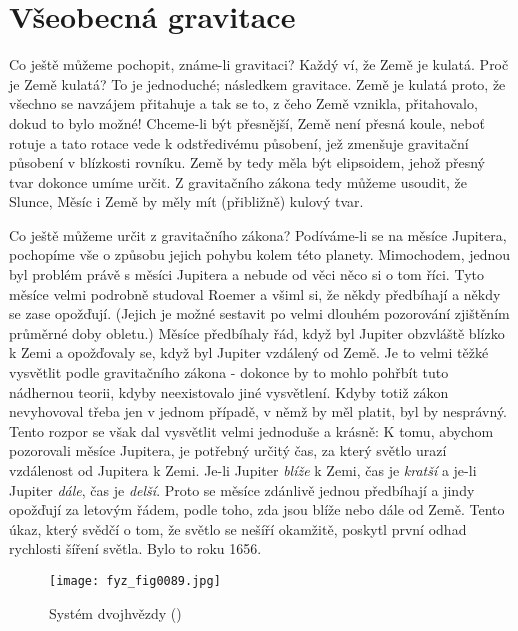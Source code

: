   \section{Všeobecná gravitace}
    Co ještě můžeme pochopit, známe-li gravitaci? Každý ví, že Země je kulatá. Proč je Země kulatá? 
    To je jednoduché; následkem gravitace. Země je kulatá proto, že všechno se navzájem přitahuje a 
    tak se to, z čeho Země vznikla, přitahovalo, dokud to bylo možné! Chceme-li být přesnější, Země 
    není přesná koule, neboť rotuje a tato rotace vede k odstředivému působení, jež zmenšuje 
    gravitační působení v blízkosti rovníku. Země by tedy měla být elipsoidem, jehož přesný tvar 
    dokonce umíme určit. Z gravitačního zákona tedy můžeme usoudit, že Slunce, Měsíc i Země by měly 
    mít (přibližně) kulový tvar.
    
    Co ještě můžeme určit z gravitačního zákona? Podíváme-li se na měsíce Jupitera, pochopíme vše o 
    způsobu jejich pohybu kolem této planety. Mimochodem, jednou byl problém právě s měsíci 
    Jupitera a nebude od věci něco si o tom říci. Tyto měsíce velmi podrobně studoval Roemer a 
    všiml si, že někdy předbíhají  a někdy se zase opožďují. (Jejich  
    je možné sestavit po velmi dlouhém pozorování zjištěním průměrné doby obletu.) Měsíce 
    předbíhaly řád, když byl Jupiter obzvláště blízko k Zemi a opožďovaly se, když byl Jupiter 
    vzdálený od Země. Je to velmi těžké vysvětlit podle gravitačního zákona - dokonce by to mohlo 
    pohřbít tuto nádhernou teorii, kdyby neexistovalo jiné vysvětlení. Kdyby totiž zákon 
    nevyhovoval třeba jen v jednom případě, v němž by měl platit, byl by nesprávný. Tento rozpor se 
    však dal vysvětlit velmi jednoduše a krásně: K tomu, abychom pozorovali měsíce Jupitera, je 
    potřebný určitý čas, za který světlo urazí vzdálenost od Jupitera k Zemi. Je-li Jupiter 
    \emph{blíže} k Zemi, čas je \emph{kratší} a je-li Jupiter \emph{dále}, čas je \emph{delší}. 
    Proto se měsíce zdánlivě jednou předbíhají a jindy opožďují za letovým řádem, podle toho, zda 
    jsou blíže nebo dále od Země. Tento úkaz, který svědčí o tom, že světlo se nešíří okamžitě, 
    poskytl první odhad rychlosti šíření světla. Bylo to roku 1656.
    
    \begin{figure}[ht!]  %
      \centering
      \texttt{[image: fyz\_fig0089.jpg]}
      \caption{Systém dvojhvězdy (\cite[s.~99]{Feynman01})}
      \label{fyz:fig0089}
    \end{figure}
    

